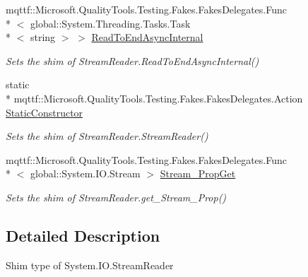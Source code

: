 \begin{DoxyCompactItemize}
mqttf\-::\-Microsoft.\-Quality\-Tools.\-Testing.\-Fakes.\-Fakes\-Delegates.\-Func\\*
$<$ global\-::\-System.\-Threading.\-Tasks.\-Task\\*
$<$ string $>$ $>$ \hyperlink{class_system_1_1_i_o_1_1_fakes_1_1_shim_stream_reader_ab911284aaf5a8e094e1e177624399757}{Read\-To\-End\-Async\-Internal}
\begin{DoxyCompactList}\small\item\em Sets the shim of Stream\-Reader.\-Read\-To\-End\-Async\-Internal()\end{DoxyCompactList}\item 
static \\*
mqttf\-::\-Microsoft.\-Quality\-Tools.\-Testing.\-Fakes.\-Fakes\-Delegates.\-Action \hyperlink{class_system_1_1_i_o_1_1_fakes_1_1_shim_stream_reader_ae26a21fd06bfb2a3753f5dc3cea418d7}{Static\-Constructor}
\begin{DoxyCompactList}\small\item\em Sets the shim of Stream\-Reader.\-Stream\-Reader()\end{DoxyCompactList}\item 
mqttf\-::\-Microsoft.\-Quality\-Tools.\-Testing.\-Fakes.\-Fakes\-Delegates.\-Func\\*
$<$ global\-::\-System.\-I\-O.\-Stream $>$ \hyperlink{class_system_1_1_i_o_1_1_fakes_1_1_shim_stream_reader_a8750bbc521c0510e122337b518f78aae}{Stream\-\_\-\-Prop\-Get}
\begin{DoxyCompactList}\small\item\em Sets the shim of Stream\-Reader.\-get\-\_\-\-Stream\-\_\-\-Prop()\end{DoxyCompactList}\end{DoxyCompactItemize}


\subsection{Detailed Description}
Shim type of System.\-I\-O.\-Stream\-Reader



